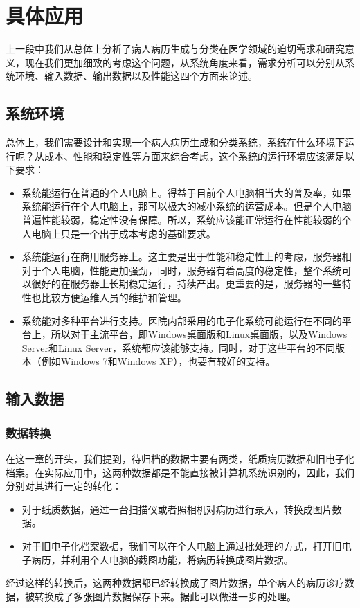 \section{具体应用}
上一段中我们从总体上分析了病人病历生成与分类在医学领域的迫切需求和研究意义，现在我们更加细致的考虑这个问题，从系统角度来看，需求分析可以分别从系统环境、输入数据、输出数据以及性能这四个方面来论述。

\subsection{系统环境}
总体上，我们需要设计和实现一个病人病历生成和分类系统，系统在什么环境下运行呢？从成本、性能和稳定性等方面来综合考虑，这个系统的运行环境应该满足以下要求：
\begin{itemize}
	\item 系统能运行在普通的个人电脑上。得益于目前个人电脑相当大的普及率，如果系统能运行在个人电脑上，那可以极大的减小系统的运营成本。但是个人电脑普遍性能较弱，稳定性没有保障。所以，系统应该能正常运行在性能较弱的个人电脑上只是一个出于成本考虑的基础要求。
	\item 系统能运行在商用服务器上。这主要是出于性能和稳定性上的考虑，服务器相对于个人电脑，性能更加强劲，同时，服务器有着高度的稳定性，整个系统可以很好的在服务器上长期稳定运行，持续产出。更重要的是，服务器的一些特性也比较方便运维人员的维护和管理。
	\item 系统能对多种平台进行支持。医院内部采用的电子化系统可能运行在不同的平台上，所以对于主流平台，即Windows桌面版和Linux桌面版，以及Windows Server和Linux Server，系统都应该能够支持。同时，对于这些平台的不同版本（例如Windows 7和Windows XP），也要有较好的支持。
\end{itemize}

\subsection{输入数据}
\subsubsection*{数据转换}
在这一章的开头，我们提到，待归档的数据主要有两类，纸质病历数据和旧电子化档案。在实际应用中，这两种数据都是不能直接被计算机系统识别的，因此，我们分别对其进行一定的转化：
\begin{itemize}
	\item 对于纸质数据，通过一台扫描仪或者照相机对病历进行录入，转换成图片数据。
	\item 对于旧电子化档案数据，我们可以在个人电脑上通过批处理的方式，打开旧电子病历，并利用个人电脑的截图功能，将病历转换成图片数据。
\end{itemize}
经过这样的转换后，这两种数据都已经转换成了图片数据，单个病人的病历诊疗数据，被转换成了多张图片数据保存下来。据此可以做进一步的处理。

